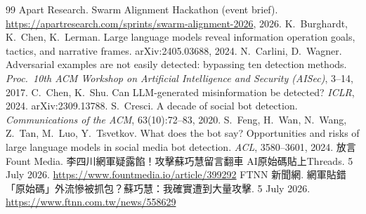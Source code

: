 \documentclass[10pt]{article}
\begin{document}

\begin{thebibliography}{99}\small
{} Apart Research. Swarm Alignment Hackathon (event brief). \url{https://apartresearch.com/sprints/swarm-alignment-2026}, 2026.
 K.~Burghardt, K.~Chen, K.~Lerman. Large language models reveal information operation goals, tactics, and narrative frames. arXiv:2405.03688, 2024.
 N.~Carlini, D.~Wagner. Adversarial examples are not easily detected: bypassing ten detection methods. \emph{Proc.\ 10th ACM Workshop on Artificial Intelligence and Security (AISec)}, 3--14, 2017.
 C.~Chen, K.~Shu. Can LLM-generated misinformation be detected? \emph{ICLR}, 2024. arXiv:2309.13788.
 S.~Cresci. A decade of social bot detection. \emph{Communications of the ACM}, 63(10):72--83, 2020.
 S.~Feng, H.~Wan, N.~Wang, Z.~Tan, M.~Luo, Y.~Tsvetkov. What does the bot say? Opportunities and risks of large language models in social media bot detection. \emph{ACL}, 3580--3601, 2024.
 放言 Fount Media. 李四川網軍疑露餡！攻擊蘇巧慧留言翻車 AI原始碼貼上Threads. 5 July 2026. \url{https://www.fountmedia.io/article/399292}
FTNN 新聞網. 網軍貼錯「原始碼」外流慘被抓包？蘇巧慧：我確實遭到大量攻擊. 5 July 2026. \url{https://www.ftnn.com.tw/news/558629}


\end{thebibliography}
\end{document}

